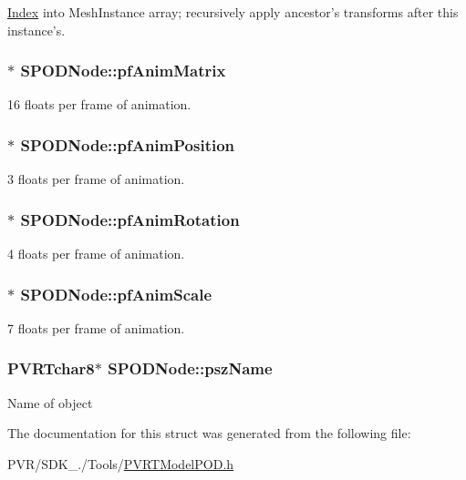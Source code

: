 \hyperlink{struct_index}{Index} into Mesh\+Instance array; recursively apply ancestor's transforms after this instance's. \hypertarget{struct_s_p_o_d_node_ad394fea8e28134bb668496a0d7d1386b}{
\subsubsection[{pf\+Anim\+Matrix}]{$\ast$ S\+P\+O\+D\+Node\+::pf\+Anim\+Matrix}}\label{struct_s_p_o_d_node_ad394fea8e28134bb668496a0d7d1386b}
16 floats per frame of animation. \hypertarget{struct_s_p_o_d_node_a0db7cb2e3efe3080628feda0eb64e659}{
\subsubsection[{pf\+Anim\+Position}]{$\ast$ S\+P\+O\+D\+Node\+::pf\+Anim\+Position}}\label{struct_s_p_o_d_node_a0db7cb2e3efe3080628feda0eb64e659}
3 floats per frame of animation. \hypertarget{struct_s_p_o_d_node_aae8ad1211d2accf32afbee44f077dd6f}{
\subsubsection[{pf\+Anim\+Rotation}]{$\ast$ S\+P\+O\+D\+Node\+::pf\+Anim\+Rotation}}\label{struct_s_p_o_d_node_aae8ad1211d2accf32afbee44f077dd6f}
4 floats per frame of animation. \hypertarget{struct_s_p_o_d_node_ac5dc3ff874688075ee7d6e7af7c672cc}{
\subsubsection[{pf\+Anim\+Scale}]{$\ast$ S\+P\+O\+D\+Node\+::pf\+Anim\+Scale}}\label{struct_s_p_o_d_node_ac5dc3ff874688075ee7d6e7af7c672cc}
7 floats per frame of animation. \hypertarget{struct_s_p_o_d_node_a98df89ff10b3189f704a0cb43aa88ecd}{
\subsubsection[{psz\+Name}]{\setlength{\rightskip}{0pt plus 5cm}P\+V\+R\+Tchar8$\ast$ S\+P\+O\+D\+Node\+::psz\+Name}}\label{struct_s_p_o_d_node_a98df89ff10b3189f704a0cb43aa88ecd}
Name of object 

The documentation for this struct was generated from the following file\+:\begin{DoxyCompactItemize}
\item 
P\+V\+R/\+S\+D\+K\+\_./\+Tools/\hyperlink{_p_v_r_t_model_p_o_d_8h}{P\+V\+R\+T\+Model\+P\+O\+D.\+h}\end{DoxyCompactItemize}
